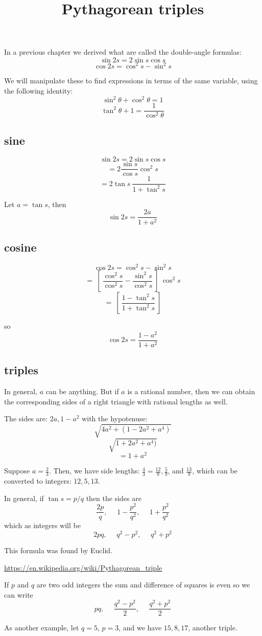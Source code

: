 \documentclass[11pt, oneside]{article}
\title{Pythagorean triples}
\date{}
\begin{document}
\maketitle
\Large


In a previous chapter we derived what are called the double-angle formulas:
\[ \sin 2s = 2 \sin s \cos s \]
\[ \cos 2s = \cos^2 s - \sin^2 s \]

We will manipulate these to find expressions in terms of the same variable, using the following identity:
\[ \sin^2 \theta + \cos^2 \theta = 1 \]
\[ \tan^2 \theta + 1 = \frac{1}{\cos^2 \theta} \]

\subsection*{sine}

\[ \sin 2s = 2 \sin s \cos s \]
\[ = 2 \frac{\sin s}{\cos s} \cos^2 s \]
\[ = 2 \tan s \ \frac{1}{1 + \tan^2 s} \]

Let $a = \tan s$, then
\[ \sin 2s = \frac{2a}{1 + a^2} \]

\subsection*{cosine}

\[ \cos 2s = \cos^2 s - \sin^2 s \]
\[ = \ [ \ \frac{\cos^2 s}{\cos^2 s} - \frac{\sin^2 s}{\cos^2 s} \ ] \ \cos^2 s \]
\[ = \ [ \ \frac{1 - \tan^2 s}{1 + \tan^2 s} \ ] \]
 
so
\[ \cos 2s = \frac{1 - a^2}{1 + a^2} \]

\subsection*{triples}

In general, $a$ can be anything.  But if $a$ is a rational number, then we can obtain the corresponding sides of a right triangle with rational lengths as well.  

The sides are:  $2a, 1 - a^2$ with the hypotenuse:
\[ \sqrt{4a^2 + (1 - 2a^2 + a^4)} \]
\[ \sqrt{1 + 2a^2 + a^4)} \]
\[ = 1 + a^2 \]

Suppose $a = \frac{2}{3}$.  Then, we have side lengths:  $\frac{4}{3} = \frac{12}{9},\frac{5}{9}$, and $\frac{13}{9}$, which can be converted to integers:  $12, 5, 13$.

In general, if $\tan s = p/q$ then the sides are
\[ \frac{2p}{q}, \ \ \ \ \ \ 1 - \frac{p^2}{q^2}, \ \ \ \ \ \ 1 +\frac{p^2}{q^2} \]
which as integers will be
\[ 2pq, \ \ \ \ \ \ q^2 - p^2, \ \ \ \ \ \ q^2 + p^2 \]

This formula was found by Euclid.

\url{https://en.wikipedia.org/wiki/Pythagorean_triple}

If $p$ and $q$ are two odd integers the sum and difference of squares is even so we can write
\[ pq, \ \ \ \ \ \ \frac{q^2 - p^2}{2}, \ \ \ \ \ \ \frac{q^2 + p^2}{2} \]

As another example, let $q = 5$, $p = 3$, and we have $15, 8, 17$, another triple.
\end{document}
